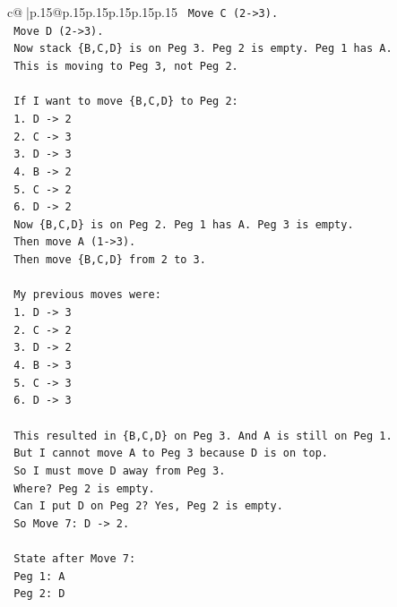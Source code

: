 \documentclass{article}
\begin{document}
{\begin{supertabular}{c@{$\;$}|p{.15\linewidth}@{}p{.15\linewidth}p{.15\linewidth}p{.15\linewidth}p{.15\linewidth}p{.15\linewidth}}
{{{\texttt{       Move C (2{-}>3).} \\
\texttt{       Move D (2{-}>3).} \\
\texttt{       Now stack \{B,C,D\} is on Peg 3. Peg 2 is empty. Peg 1 has A.} \\
\texttt{       This is moving to Peg 3, not Peg 2.} \\
\\ 
\texttt{       If I want to move \{B,C,D\} to Peg 2:} \\
\texttt{       1. D {-}> 2} \\
\texttt{       2. C {-}> 3} \\
\texttt{       3. D {-}> 3} \\
\texttt{       4. B {-}> 2} \\
\texttt{       5. C {-}> 2} \\
\texttt{       6. D {-}> 2} \\
\texttt{       Now \{B,C,D\} is on Peg 2. Peg 1 has A. Peg 3 is empty.} \\
\texttt{       Then move A (1{-}>3).} \\
\texttt{       Then move \{B,C,D\} from 2 to 3.} \\
\\ 
\texttt{    My previous moves were:} \\
\texttt{    1. D {-}> 3} \\
\texttt{    2. C {-}> 2} \\
\texttt{    3. D {-}> 2} \\
\texttt{    4. B {-}> 3} \\
\texttt{    5. C {-}> 3} \\
\texttt{    6. D {-}> 3} \\
\\ 
\texttt{    This resulted in \{B,C,D\} on Peg 3. And A is still on Peg 1.} \\
\texttt{    But I cannot move A to Peg 3 because D is on top.} \\
\texttt{    So I must move D away from Peg 3.} \\
\texttt{    Where? Peg 2 is empty.} \\
\texttt{    Can I put D on Peg 2? Yes, Peg 2 is empty.} \\
\texttt{    So Move 7: D {-}> 2.} \\
\\ 
\texttt{    State after Move 7:} \\
\texttt{    Peg 1: A} \\
\texttt{    Peg 2: D} \\
}}}
\end{supertabular}}
\end{document}
